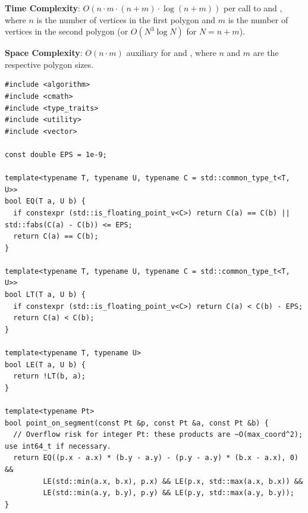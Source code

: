\textbf{Time Complexity}: $O(n \cdot m \cdot (n + m) \cdot \log\left(n + m\right))$ per call to  and , where $n$ is the number of vertices in the first polygon and $m$ is the number of vertices in the second polygon (or $O(N^{3} \log N)$ for $N = n + m$).

\textbf{Space Complexity}: $O(n \cdot m)$ auxiliary for  and , where $n$ and $m$ are the respective polygon sizes.

\begin{lstlisting}[style=cpp]
#include <algorithm>
#include <cmath>
#include <type_traits>
#include <utility>
#include <vector>

const double EPS = 1e-9;

template<typename T, typename U, typename C = std::common_type_t<T, U>>
bool EQ(T a, U b) {
  if constexpr (std::is_floating_point_v<C>) return C(a) == C(b) || std::fabs(C(a) - C(b)) <= EPS;
  return C(a) == C(b);
}

template<typename T, typename U, typename C = std::common_type_t<T, U>>
bool LT(T a, U b) {
  if constexpr (std::is_floating_point_v<C>) return C(a) < C(b) - EPS;
  return C(a) < C(b);
}

template<typename T, typename U>
bool LE(T a, U b) {
  return !LT(b, a);
}

template<typename Pt>
bool point_on_segment(const Pt &p, const Pt &a, const Pt &b) {
  // Overflow risk for integer Pt: these products are ~O(max_coord^2); use int64_t if necessary.
  return EQ((p.x - a.x) * (b.y - a.y) - (p.y - a.y) * (b.x - a.x), 0) &&
         LE(std::min(a.x, b.x), p.x) && LE(p.x, std::max(a.x, b.x)) &&
         LE(std::min(a.y, b.y), p.y) && LE(p.y, std::max(a.y, b.y));
}


\end{lstlisting}
